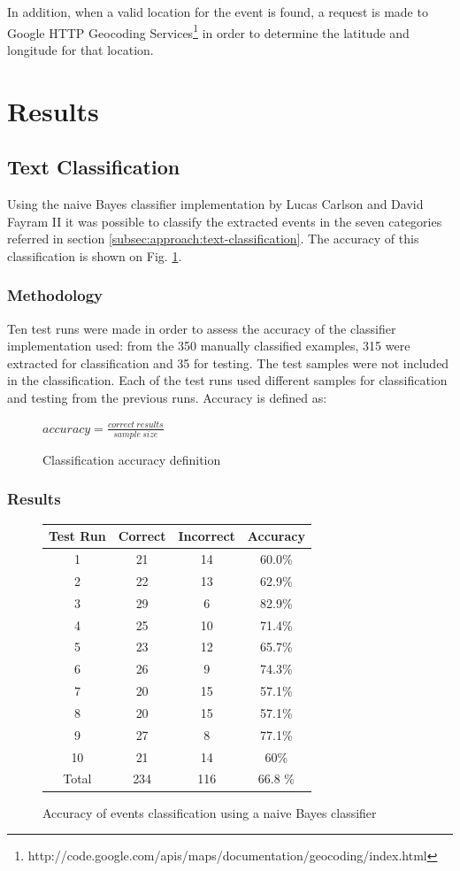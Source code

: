 \documentclass{llncs}
\begin{document}
In addition, when a valid location for the event is found, a request is made to Google HTTP Geocoding Services\footnote{http://code.google.com/apis/maps/documentation/geocoding/index.html} in order to determine the latitude and longitude for that location.

\section{Results}

\subsection{Text Classification}

Using the naive Bayes classifier implementation by Lucas Carlson and David Fayram II\cite{classifier} it was possible to classify the extracted events in the seven categories referred in section \ref{subsec:approach:text-classification}. The accuracy of this classification is shown on Fig. \ref{fig:classifier-accuracy}.

\subsubsection{Methodology}

Ten test runs were made in order to assess the accuracy of the classifier implementation used: from the 350 manually classified examples, 315 were extracted for classification and 35 for testing. The test samples were not included in the classification. Each of the test runs used different samples for classification and testing from the previous runs. Accuracy is defined as:
\begin{figure}
	\centering
	\Large{$accuracy = \frac{correct\ results}{sample\ size}$}
	\caption{Classification accuracy definition}
\end{figure}

\subsubsection{Results}
\begin{figure}[h!]
	\centering
	\begin{tabular}{c|c|c|c}
	\textbf{Test Run} & \textbf{Correct} & \textbf{Incorrect} & \textbf{Accuracy}\\
	\hline
	1 & 21 & 14 & 60.0\% \\
	2 & 22 & 13 & 62.9\% \\
	3 & 29 & 6 & 82.9\% \\
	4 & 25 & 10 & 71.4\% \\
	5 & 23 & 12 & 65.7\% \\
	6 & 26 & 9 & 74.3\% \\
	7 & 20 & 15 & 57.1\% \\
	8 & 20 & 15 & 57.1\% \\
	9 & 27 & 8 & 77.1\% \\
	10 & 21 & 14 & 60\% \\
	\hline
	Total & 234 & 116 & 66.8 \%
	\end{tabular}
	\caption{Accuracy of events classification using a naive Bayes classifier}
	\label{fig:classifier-accuracy}
\end{figure}
\end{document}
